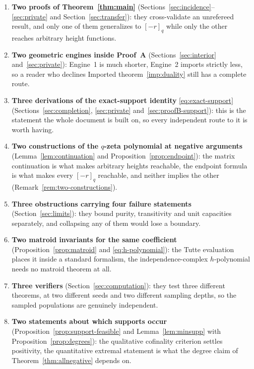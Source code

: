 \documentclass[11pt]{article}
\numberwithin{equation}{section}
\theoremstyle{definition}
\theoremstyle{remark}
\newcommand{\qint}[1]{[#1]_q}
\begin{document}
\begin{enumerate}[label=(\arabic*),leftmargin=2.2em]
\item \textbf{Two proofs of Theorem~\ref{thm:main}}
 (Sections~\ref{sec:incidence}--\ref{sec:private} and
 Section~\ref{sec:transfer}): they cross-validate an unrefereed result, and
 only one of them generalizes to $\qint{-r}$ while only the other reaches
 arbitrary height functions.
\item \textbf{Two geometric engines inside Proof~A}
 (Sections~\ref{sec:interior} and~\ref{sec:private}): Engine~1 is much
 shorter, Engine~2 imports strictly less, so a reader who declines
 Imported theorem~\ref{imp:duality} still has a complete route.
\item \textbf{Three derivations of the exact-support identity}
 \eqref{eq:exact-support} (Sections~\ref{sec:completion}, \ref{sec:private}
 and~\ref{sec:proofB-support}): this is the statement the whole document is
 built on, so every independent route to it is worth having.
\item \textbf{Two constructions of the $q$-zeta polynomial at negative
 arguments} (Lemma~\ref{lem:continuation} and
 Proposition~\ref{prop:endpoint}): the matrix continuation is what makes
 arbitrary heights reachable, the endpoint formula is what makes every
 $\qint{-r}$ reachable, and neither implies the other
 (Remark~\ref{rem:two-constructions}).
\item \textbf{Three obstructions carrying four failure statements}
 (Section~\ref{sec:limits}): they bound purity, transitivity and unit
 capacities separately, and collapsing any of them would lose a boundary.
\item \textbf{Two matroid invariants for the same coefficient}
 (Proposition~\ref{prop:matroid} and \eqref{eq:h-polynomial}): the Tutte
 evaluation places it inside a standard formalism, the independence-complex
 $h$-polynomial needs no matroid theorem at all.
\item \textbf{Three verifiers} (Section~\ref{sec:computation}): they test
 three different theorems, at two different seeds and two different sampling
 depths, so the sampled populations are genuinely independent.
\item \textbf{Two statements about which supports occur}
 (Proposition~\ref{prop:support-feasible} and
 Lemma~\ref{lem:minsupp} with Proposition~\ref{prop:degrees}): the
 qualitative cofinality criterion settles positivity, the quantitative
 extremal statement is what the degree claim of
 Theorem~\ref{thm:allnegative} depends on.

\end{enumerate}
\end{document}
